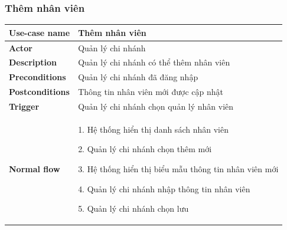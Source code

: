         \subsubsection{Thêm nhân viên}
        {
\setlength\extrarowheight{6pt}
            \begin{longtable}{| p{} | p{} |} 
                \hline
                    \textbf{Use-case name} 
                & 
                    Thêm nhân viên
                \\
                \hline
                    \textbf{Actor} 
                & 
                    Quản lý chi nhánh
                \\
                \hline
                    \textbf{Description} 
                & 
                    Quản lý chi nhánh có thể thêm nhân viên
                \\
                \hline
                    \textbf{Preconditions} 
                &
                    Quản lý chi nhánh đã đăng nhập
                \\
                \hline
                    \textbf{Postconditions} 
                & 
                    Thông tin nhân viên mới được cập nhật
                \\
                \hline
                    \textbf{Trigger} 
                & 
                    Quản lý chi nhánh chọn quản lý nhân viên
                \\
                \hline
                \begin{flushleft}
                    \textbf{Normal flow}
                \end{flushleft}
                & 
                1. Hệ thống hiển thị danh sách nhân viên
                    
                    2. Quản lý chi nhánh chọn thêm mới
                    
                    3. Hệ thống hiển thị biểu mẫu thông tin  nhân viên mới
                    
                    4. Quản lý chi nhánh nhập thông tin nhân viên
                    
                    5. Quản lý chi nhánh chọn lưu
                    

\end{longtable}}

